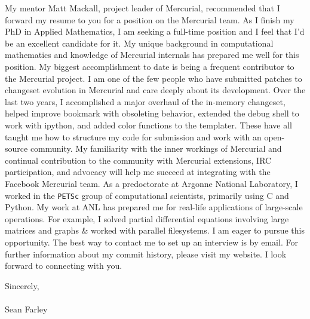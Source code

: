 \documentclass[]{fancy-cv}
\begin{document}
My mentor Matt Mackall, project leader of Mercurial, recommended that I forward
my resume to you for a position on the Mercurial team. As I finish my PhD in
Applied Mathematics, I am seeking a full-time position and I feel that I’d be
an excellent candidate for it.
%
\newline\newline
%
My unique background in computational mathematics and knowledge of Mercurial
internals has prepared me well for this position. My biggest accomplishment to
date is being a frequent contributor to the Mercurial project. I am one of the
few people who have submitted patches to changeset evolution in Mercurial and
care deeply about its development.
%
\newline\newline
%
Over the last two years, I accomplished a major overhaul of the in-memory
changeset, helped improve bookmark with obsoleting behavior, extended the debug
shell to work with ipython, and added color functions to the templater. These
have all taught me how to structure my code for submission and work with an
open-source community. My familiarity with the inner workings of Mercurial and
continual contribution to the community with Mercurial extensions, IRC
participation, and advocacy will help me succeed at integrating with the
Facebook Mercurial team.
%
\newline\newline
%
As a predoctorate at Argonne National Laboratory, I worked in the
\texttt{PETSc} group of computational scientists, primarily using C and
Python. My work at ANL has prepared me for real-life applications of
large-scale operations. For example, I solved partial differential equations
involving large matrices and graphs \& worked with parallel filesystems.
%
\newline\newline
%
I am eager to pursue this opportunity. The best way to contact me to set up an
interview is by email. For further information about my commit history, please
visit my website. I look forward to connecting with you.

\vspace{2em}
Sincerely,\\
\\
Sean Farley
\end{document}
